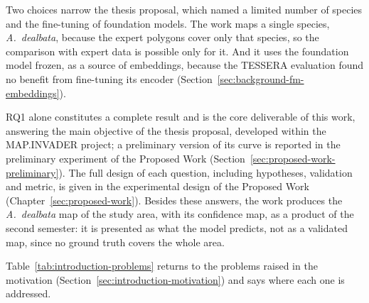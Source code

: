 Two choices narrow the thesis proposal, which named a limited number
of species and the fine-tuning of foundation models. The work maps a
single species, \emph{A.~dealbata}, because the expert polygons cover
only that species, so the comparison with expert data is possible only
for it. And it uses the foundation model frozen, as a source of
embeddings, because the TESSERA evaluation found no benefit from
fine-tuning its encoder (Section~\ref{sec:background-fm-embeddings}).

RQ1 alone constitutes a complete result and is the core deliverable
of this work, answering the main objective of the thesis proposal,
developed within the MAP.INVADER project; a preliminary version of its
curve is reported in the preliminary experiment of the Proposed Work
(Section~\ref{sec:proposed-work-preliminary}). The
full design of each question, including hypotheses, validation and
metric, is given in the experimental design of the Proposed Work
(Chapter~\ref{sec:proposed-work}). Besides these
answers, the work produces the \emph{A.~dealbata} map of the study
area, with its confidence map, as a product of the second semester:
it is presented as what the model predicts, not as a validated map,
since no ground truth covers the whole area.

Table~\ref{tab:introduction-problems} returns to the problems raised in
the motivation (Section~\ref{sec:introduction-motivation}) and says where each one is
addressed.

